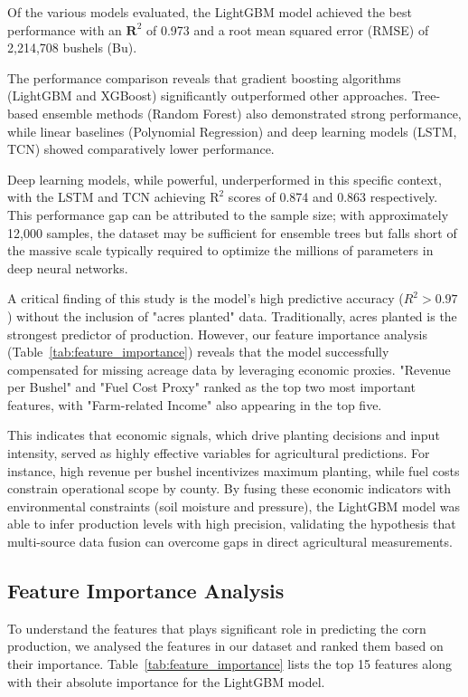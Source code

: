 \documentclass[10pt,twocolumn]{article}
\begin{document}
Of the various models evaluated, the LightGBM model achieved the best performance with an $\mathbf{R}^{2}$ of 0.973 and a root mean squared error (RMSE) of 2,214,708 bushels (Bu).

The performance comparison reveals that gradient boosting algorithms (LightGBM and XGBoost) significantly outperformed other approaches. Tree-based ensemble methods (Random Forest) also demonstrated strong performance, while linear baselines (Polynomial Regression) and deep learning models (LSTM, TCN) showed comparatively lower performance.

Deep learning models, while powerful, underperformed in this specific context, with the LSTM and TCN achieving $\mathrm{R}^{2}$ scores of 0.874 and 0.863 respectively. This performance gap can be attributed to the sample size; with approximately 12,000 samples, the dataset may be sufficient for ensemble trees but falls short of the massive scale typically required to optimize the millions of parameters in deep neural networks.

A critical finding of this study is the model's high predictive accuracy ($R^{2}>0.97$) without the inclusion of "acres planted" data. Traditionally, acres planted is the strongest predictor of production. However, our feature importance analysis (Table~\ref{tab:feature_importance}) reveals that the model successfully compensated for missing acreage data by leveraging economic proxies. "Revenue per Bushel" and "Fuel Cost Proxy" ranked as the top two most important features, with "Farm-related Income" also appearing in the top five.

This indicates that economic signals, which drive planting decisions and input intensity, served as highly effective variables for agricultural predictions. For instance, high revenue per bushel incentivizes maximum planting, while fuel costs constrain operational scope by county. By fusing these economic indicators with environmental constraints (soil moisture and pressure), the LightGBM model was able to infer production levels with high precision, validating the hypothesis that multi-source data fusion can overcome gaps in direct agricultural measurements.

\subsection{Feature Importance Analysis}

To understand the features that plays significant role in predicting the corn production, we analysed the features in our dataset and ranked them based on their importance. Table~\ref{tab:feature_importance} lists the top 15 features along with their absolute importance for the LightGBM model.
\end{document}
